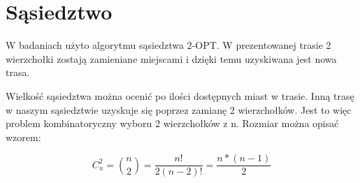 \section{Sąsiedztwo}

W badaniach użyto algorytmu sąsiedztwa 2-OPT. W prezentowanej trasie 
2 wierzchołki zostają zamieniane miejscami i dzięki temu uzyskiwana jest 
nowa trasa.

Wielkość sąsiedztwa można ocenić po ilości dostępnych miast w trasie.
Inną trasę w naszym sąsiedztwie uzyskuje się poprzez zamianę 2 wierzchołków.
Jest to więc problem kombinatoryczny wyboru 2 wierzchołków z n. Rozmiar można 
opisać wzorem:

$$ C_{n}^{2} = {n\choose 2} = \frac{n!}{2(n-2)!} = \frac{n * (n-1)}{2}$$